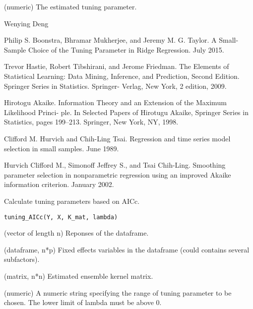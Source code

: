 \documentclass[a4paper]{book}
\begin{document}
%
\begin{Details}\relax
{}

\end{Details}
%
\begin{Value}
\begin{ldescription}
\item[\code{lambda0}] (numeric) The estimated tuning parameter.
\end{ldescription}
\end{Value}
%
\begin{Author}\relax
Wenying Deng
\end{Author}
%
\begin{References}\relax
Philip S. Boonstra, Bhramar Mukherjee, and Jeremy M. G. Taylor.
A Small-Sample Choice of the Tuning Parameter in Ridge Regression. July
2015.

Trevor Hastie, Robert Tibshirani, and Jerome Friedman. The Elements of
Statistical Learning: Data Mining, Inference, and Prediction, Second
Edition. Springer Series in Statistics. Springer- Verlag, New York, 2
edition, 2009.

Hirotogu Akaike. Information Theory and an Extension of the Maximum
Likelihood Princi- ple. In Selected Papers of Hirotugu Akaike, Springer
Series in Statistics, pages 199–213. Springer, New York, NY, 1998.

Clifford M. Hurvich and Chih-Ling Tsai. Regression and time series model
selection in small samples. June 1989.

Hurvich Clifford M., Simonoff Jeffrey S., and Tsai Chih-Ling. Smoothing
parameter selection in nonparametric regression using an improved Akaike
information criterion. January 2002.
\end{References}
%
\begin{Description}\relax
Calculate tuning parameters based on AICc.
\end{Description}
%
\begin{Usage}
\begin{verbatim}
tuning_AICc(Y, X, K_mat, lambda)
\end{verbatim}
\end{Usage}
%
\begin{Arguments}
\begin{ldescription}
\item[\code{Y}] (vector of length n) Reponses of the dataframe.

\item[\code{X}] (dataframe, n*p) Fixed effects variables in the dataframe (could
contains several subfactors).

\item[\code{K\_mat}] (matrix, n*n) Estimated ensemble kernel matrix.

\item[\code{lambda}] (numeric) A numeric string specifying the range of tuning parameter 
to be chosen. The lower limit of lambda must be above 0.
\end{ldescription}
\end{Arguments}
\end{document}
